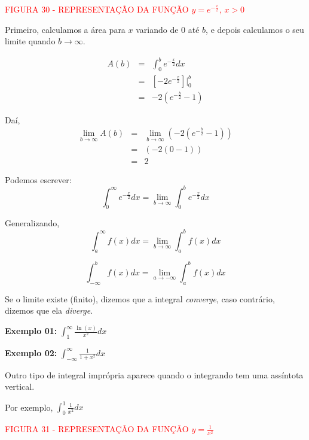 \documentclass[oneside,a4paper,12pt]{article}
\begin{document}
\vspace{220pt}
\begin{center}
	\textcolor{red}{FIGURA 30 - REPRESENTAÇÃO DA FUNÇÃO $y = e^{-\frac{x}{2}}$, $x>0$ }
\end{center}

Primeiro, calculamos a área para $x$ variando de $0$ até $b$, e depois calculamos o seu limite quando $b \rightarrow \infty$.

\begin{eqnarray*}
A(b) & = & \int_{0}^{b}e^{-\frac{x}{2}}dx \\
& = & [-2e^{-\frac{x}{2}}]|_{0}^{b} \\
& = & -2(e^{-\frac{b}{2}}-1) 
\end{eqnarray*}

Daí,
\begin{eqnarray*}
\lim\limits_{b \rightarrow \infty}A(b) & = & \lim\limits_{b \rightarrow \infty}(-2(e^{-\frac{b}{2}}-1)) \\
& = & (-2 (0-1)) \\
& = & 2
\end{eqnarray*}

Podemos escrever:
$$\int_{0}^{\infty}e^{-\frac{x}{2}}dx = \lim\limits_{b \rightarrow \infty}\int_{0}^{b}e^{-\frac{x}{2}}dx$$

Generalizando,
$$\int_{a}^{\infty}f(x)dx = \lim\limits_{b \rightarrow \infty}\int_{a}^{b}f(x)dx$$

$$\int_{-\infty}^{b}f(x)dx = \lim\limits_{a \rightarrow - \infty}\int_{a}^{b}f(x)dx$$

Se o limite existe (finito), dizemos que a integral \emph{converge}, caso contrário, dizemos que ela \emph{diverge}.

{\bf Exemplo 01:} $\int_{1}^{\infty}\frac{\ln(x)}{x^2}dx$
\vspace{300pt}

{\bf Exemplo 02:} $\int_{-\infty}^{\infty}\frac{1}{1+x^2}dx$

\vspace{300pt}

Outro tipo de integral imprópria aparece quando o integrando tem uma assíntota vertical.

Por exemplo, $\int_{0}^{1}\frac{1}{x^2}dx$


\vspace{200pt}
\begin{center}
	\textcolor{red}{FIGURA 31 - REPRESENTAÇÃO DA FUNÇÃO $y = \frac{1}{x^2}$ }
\end{center}
\end{document}
